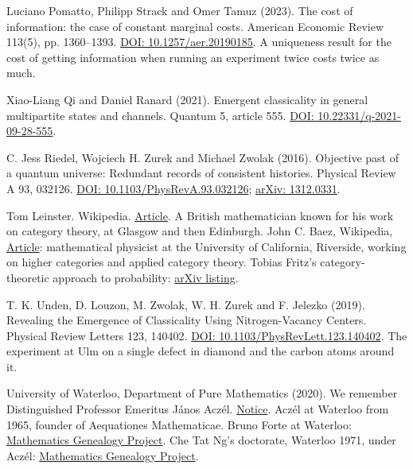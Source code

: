 \documentclass[11pt,twoside]{article}
\theoremstyle{thielethm}
\theoremstyle{thieledef}
\theoremstyle{thieledef}
\theoremstyle{thieledef}
\theoremstyle{thielethm}
\theoremstyle{thieleobs}
\theoremstyle{thielethm}
\begin{document}
\noindent Luciano Pomatto, Philipp Strack and Omer Tamuz (2023). The cost of information: the case of constant marginal costs. American Economic Review 113(5), pp. 1360--1393. \href{https://doi.org/10.1257/aer.20190185}{DOI: 10.1257/aer.20190185}. A uniqueness result for the cost of getting information when running an experiment twice costs twice as much.
\par\medskip

\noindent Xiao-Liang Qi and Daniel Ranard (2021). Emergent classicality in general multipartite states and channels. Quantum 5, article 555. \href{https://doi.org/10.22331/q-2021-09-28-555}{DOI: 10.22331/q-2021-09-28-555}.
\par\medskip

\noindent C. Jess Riedel, Wojciech H. Zurek and Michael Zwolak (2016). Objective past of a quantum universe: Redundant records of consistent histories. Physical Review A 93, 032126. \href{https://doi.org/10.1103/PhysRevA.93.032126}{DOI: 10.1103/PhysRevA.93.032126}; \href{https://arxiv.org/abs/1312.0331}{arXiv: 1312.0331}.
\par\medskip

\noindent Tom Leinster. Wikipedia. \href{https://en.wikipedia.org/wiki/Tom_Leinster}{Article}. A British mathematician known for his work on category theory, at Glasgow and then Edinburgh. John C. Baez, Wikipedia, \href{https://en.wikipedia.org/wiki/John_C._Baez}{Article}: mathematical physicist at the University of California, Riverside, working on higher categories and applied category theory. Tobias Fritz's category-theoretic approach to probability: \href{https://arxiv.org/a/fritz_t_1}{arXiv listing}.
\par\medskip

\noindent T. K. Unden, D. Louzon, M. Zwolak, W. H. Zurek and F. Jelezko (2019). Revealing the Emergence of Classicality Using Nitrogen-Vacancy Centers. Physical Review Letters 123, 140402. \href{https://doi.org/10.1103/PhysRevLett.123.140402}{DOI: 10.1103/PhysRevLett.123.140402}. The experiment at Ulm on a single defect in diamond and the carbon atoms around it.
\par\medskip

\noindent University of Waterloo, Department of Pure Mathematics (2020). We remember Distinguished Professor Emeritus János Aczél. \href{https://uwaterloo.ca/pure-mathematics/news/we-remember-distinguished-professor-emeritus-janos-aczel}{Notice}. Aczél at Waterloo from 1965, founder of Aequationes Mathematicae. Bruno Forte at Waterloo: \href{https://mathgenealogy.com/id.php?id=30611}{Mathematics Genealogy Project}. Che Tat Ng's doctorate, Waterloo 1971, under Aczél: \href{https://mathgenealogy.org/id.php?id=102040}{Mathematics Genealogy Project}.
\par\medskip
\end{document}
